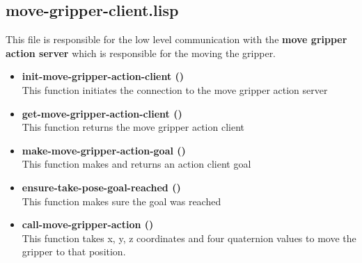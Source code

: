 \documentclass[main.tex]{subfiles}
\begin{document}
        \subsection{move-gripper-client.lisp}
        This file is responsible for the low level communication with the
        \textbf{move gripper action server} which is responsible for the moving the gripper.
        \begin{itemize}
            \item \textbf{init-move-gripper-action-client ()} \\
            This function initiates the connection to the move gripper action server
            \item \textbf{get-move-gripper-action-client ()} \\
            This function returns the move gripper action client
            \item \textbf{make-move-gripper-action-goal ()} \\
            This function makes and returns an action client goal
            \item \textbf{ensure-take-pose-goal-reached ()} \\
            This function makes sure the goal was reached
            \item \textbf{call-move-gripper-action ()} \\
            This function takes x, y, z coordinates and four quaternion values to move the gripper to that position. 
        \end{itemize}
\end{document}
